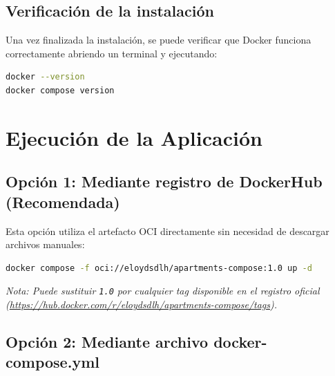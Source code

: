 \subsection{Verificación de la instalación}
Una vez finalizada la instalación, se puede verificar que Docker funciona correctamente abriendo un terminal y ejecutando:

\begin{lstlisting}[language=bash, basicstyle=\ttfamily\small]
docker --version
docker compose version
\end{lstlisting}

\section{Ejecución de la Aplicación}

\subsection{Opción 1: Mediante registro de DockerHub (Recomendada)}
Esta opción utiliza el artefacto OCI directamente sin necesidad de descargar archivos manuales:
\begin{lstlisting}[language=bash, basicstyle=\ttfamily\small]
docker compose -f oci://eloydsdlh/apartments-compose:1.0 up -d
\end{lstlisting}
\textit{Nota: Puede sustituir \texttt{1.0} por cualquier tag disponible en el registro oficial (\url{https://hub.docker.com/r/eloydsdlh/apartments-compose/tags}).}

\subsection{Opción 2: Mediante archivo docker-compose.yml}

